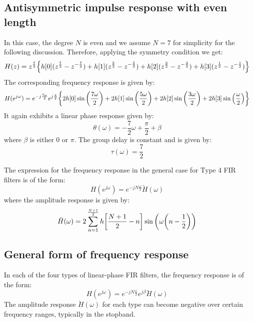 \documentclass[../../main/main.tex]{subfiles}
\begin{document}
\subsection{Antisymmetric impulse response with even length}
In this case, the degree \( N \) is even and we assume \( N = 7 \) for simplicity for the following discussion. Therefore, applying the symmetry condition we get:
\begin{equation}
    H(z)
    =
    z^{\frac{7}{2}}\qty{h[0](z^{\frac{7}{2}} - z^{-\frac{7}{2}}) + h[1](z^{\frac{5}{2}} - z^{-\frac{5}{2}}) + h[2](z^{\frac{3}{2}} - z^{-\frac{3}{2}}) + h[3](z^{\frac{1}{2}} - z^{-\frac{1}{2}})}
    \label{eq:L20_S31_1}
\end{equation}
The corresponding frequency response is given by:
\begin{equation}
    H(e^{j\omega})
    =
    e^{-j\frac{7\omega}{2}} e^{j \frac{\pi}{2}} \qty{2h[0]\sin\qty(\frac{7\omega}{2}) + 2h[1]\sin\qty(\frac{5\omega}{2}) + 2h[2]\sin\qty(\frac{3\omega}{2}) + 2h[3]\sin\qty(\frac{\omega}{2})}
    \label{eq:L20_S32_1}
\end{equation}
It again exhibits a linear phase response given by:
\begin{equation}
    \theta(\omega)
    =
    - \frac{7}{2} \omega + \frac{\pi}{2} + \beta
    \label{eq:L20_S32_2}
\end{equation}
where \( \beta \) is either \( 0 \) or \( \pi \). The group delay is constant and is given by:
\begin{equation}
    \tau(\omega)
    =
    \frac{7}{2}
    \label{eq:L20_S33_1}
\end{equation}

The expression for the frequency response in the general case for Type 4 FIR filters is of the form:
\begin{equation}
    H(e^{j\omega})
    =
    e^{-jN \frac{\omega}{2}} \breve{H}(\omega)
    \label{eq:L20_S33_2}
\end{equation}
where the amplitude response is given by:
\begin{equation}
    \breve{H}(\omega)
    =
    2 \sum_{n=1}^{\frac{N+1}{2}} h\qty[\frac{N+1}{2} - n] \sin\qty(\omega \qty(n - \frac{1}{2}))
    \label{eq:L20_S33_3}
\end{equation}



\subsection{General form of frequency response}
In each of the four types of linear-phase FIR filters, the frequency response is of the form:
\begin{equation}
    H(e^{j\omega})
    =
    e^{-jN \frac{\omega}{2}} e^{j\beta} \breve{H}(\omega)
    \label{eq:L20_S34_1}
\end{equation}
The amplitude response \( \breve{H}(\omega) \) for each type can become negative over certain frequency ranges, typically in the stopband.
\end{document}
